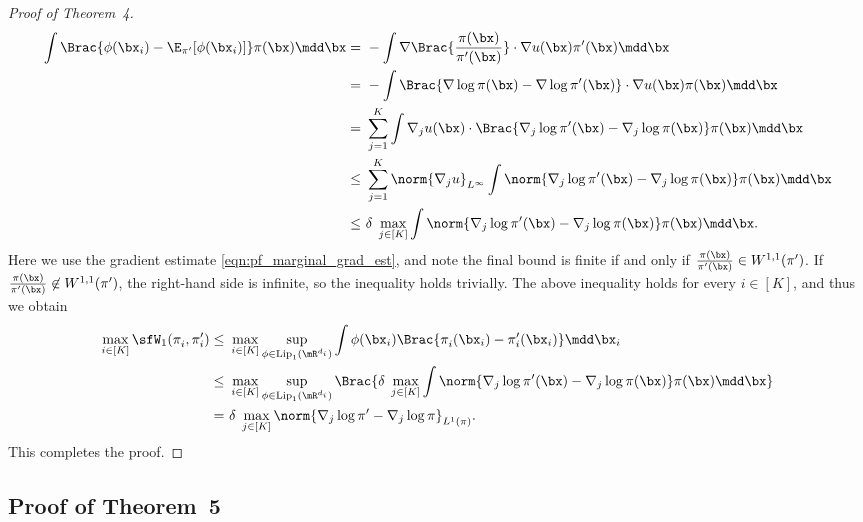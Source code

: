 \documentclass[11pt]{article}
\newcommand{\Lip}{{\rm Lip}}
\begin{document}
\begin{proof}[Proof of Theorem~4]
\begin{equation}
\begin{split}
    \int \Brac{ \phi (\bx_i) - \E_{\pi'}[\phi(\bx_i)] } \pi(\bx) \mdd \bx =~& - \int \nabla \Brac{ \frac{\pi(\bx)}{\pi'(\bx)} } \cdot \nabla u(\bx) \pi' (\bx) \mdd \bx \\
    =~& - \int \Brac{ \nabla \log \pi(\bx)- \nabla \log \pi'(\bx) } \cdot \nabla u(\bx) \pi (\bx) \mdd \bx  \\
    =~& \sum_{j=1}^K \int \nabla_j u(\bx) \cdot \Brac{ \nabla_j \log \pi' (\bx) - \nabla_j \log \pi (\bx) } \pi(\bx) \mdd \bx \\
    \le~& \sum_{j=1}^K \norm{\nabla_j u}_{L^\infty} \int \norm{ \nabla_j \log \pi' (\bx) - \nabla_j \log \pi (\bx) } \pi(\bx) \mdd \bx \\
    \le~& \delta \; \max_{j \in [K]} \int \norm{ \nabla_j \log \pi' (\bx) - \nabla_j \log \pi (\bx) } \pi(\bx) \mdd \bx.
\end{split}
\end{equation}
Here we use the gradient estimate \eqref{eqn:pf_marginal_grad_est}, and note the final bound is finite if and only if $\frac{\pi(\bx)}{\pi'(\bx)} \in W^{1,1}(\pi')$.
If $\frac{\pi(\bx)}{\pi'(\bx)} \not\in W^{1,1}(\pi')$, the right-hand side is infinite, so the inequality holds trivially.
The above inequality holds for every $i \in [K]$, and thus we obtain 
\begin{equation}
\begin{split}
    \max_{i\in[K]} \sfW_1(\pi_i^{},\pi_i') \le~& \max_{i\in[K]} \sup_{\phi\in\Lip_1(\mR^{d_i})} \int \phi(\bx_i) \Brac{ \pi_i^{}(\bx_i) - \pi_i'(\bx_i) } \mdd \bx_i \\
    \le~& \max_{i\in[K]} \sup_{\phi \in\Lip_1(\mR^{d_i})} \Brac{ \delta \; \max_{j \in [K]} \int \norm{ \nabla_j \log \pi' (\bx) - \nabla_j \log \pi (\bx) } \pi(\bx) \mdd \bx } \\
    =~& \delta \; \max_{j \in [K]} \norm{ \nabla_j \log \pi' - \nabla_j \log \pi }_{L^1(\pi)}.
\end{split}
\end{equation}
This completes the proof.
\end{proof}

\subsection{Proof of Theorem~5}
\label{app:thm_margin_multi}
\end{document}
